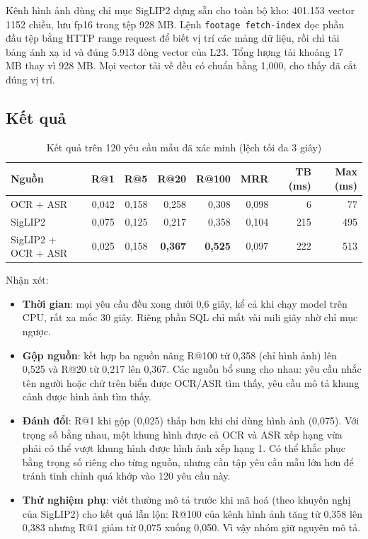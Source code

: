 Kênh hình ảnh dùng chỉ mục SigLIP2 dựng sẵn cho toàn bộ kho: 401.153 vector 1152 chiều, lưu fp16 trong tệp
928 MB. Lệnh \texttt{footage fetch-index} đọc phần đầu tệp bằng HTTP range request để biết vị
trí các mảng dữ liệu, rồi chỉ tải bảng ánh xạ id và đúng 5.913 dòng vector của L23. Tổng
lượng tải khoảng 17 MB thay vì 928 MB. Mọi vector tải về đều có chuẩn bằng 1,000, cho thấy
đã cắt đúng vị trí.

\subsection{Kết quả}

\begin{table}[H]
\centering
\caption{Kết quả trên 120 yêu cầu mẫu đã xác minh (lệch tối đa 3 giây)}
\label{tab:eval}
\renewcommand{\arraystretch}{1.2}
\small
\setlength{\tabcolsep}{5pt}
\begin{tabular}{lrrrrrrr}
\toprule
\textbf{Nguồn} & \textbf{R@1} & \textbf{R@5} & \textbf{R@20} & \textbf{R@100} & \textbf{MRR} & \textbf{TB (ms)} & \textbf{Max (ms)} \\
\midrule
OCR + ASR & 0,042 & 0,158 & 0,258 & 0,308 & 0,098 & 6 & 77 \\
SigLIP2 & 0,075 & 0,125 & 0,217 & 0,358 & 0,104 & 215 & 495 \\
SigLIP2 + OCR + ASR & 0,025 & 0,158 & \textbf{0,367} & \textbf{0,525} & 0,097 & 222 & 513 \\
\bottomrule
\end{tabular}
\end{table}

Nhận xét:
\begin{itemize}
    \item \textbf{Thời gian}: mọi yêu cầu đều xong dưới 0,6 giây, kể cả khi chạy model trên CPU,
    rất xa mốc 30 giây. Riêng phần SQL chỉ mất vài mili giây nhờ chỉ mục ngược.
    \item \textbf{Gộp nguồn}: kết hợp ba nguồn nâng R@100 từ 0,358 (chỉ hình ảnh) lên 0,525
    và R@20 từ 0,217 lên 0,367. Các nguồn bổ sung cho nhau: yêu cầu nhắc tên người hoặc chữ trên
    biển được OCR/ASR tìm thấy, yêu cầu mô tả khung cảnh được hình ảnh tìm thấy.
    \item \textbf{Đánh đổi}: R@1 khi gộp (0,025) thấp hơn khi chỉ dùng hình ảnh (0,075). Với
    trọng số bằng nhau, một khung hình được cả OCR và ASR xếp hạng vừa phải có thể vượt khung
    hình được hình ảnh xếp hạng 1. Có thể khắc phục bằng trọng số riêng cho từng nguồn, nhưng
    cần tập yêu cầu mẫu lớn hơn để tránh tinh chỉnh quá khớp vào 120 yêu cầu này.
    \item \textbf{Thử nghiệm phụ}: viết thường mô tả trước khi mã hoá (theo khuyến nghị
    của SigLIP2) cho kết quả lẫn lộn: R@100 của kênh hình ảnh tăng từ 0,358 lên 0,383 nhưng
    R@1 giảm từ 0,075 xuống 0,050. Vì vậy nhóm giữ nguyên mô tả.
\end{itemize}

